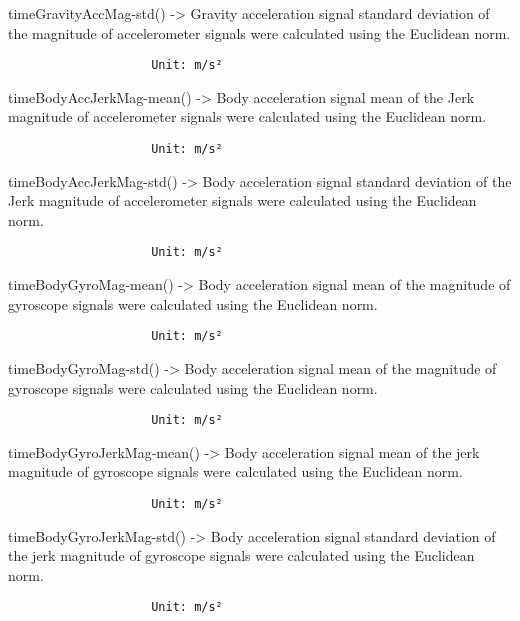 \documentclass[
]{article}
\begin{document}
timeGravityAccMag-std() -\textgreater{} Gravity acceleration signal
standard deviation of the magnitude of accelerometer signals were
calculated using the Euclidean norm.

\begin{verbatim}
                    Unit: m/s²
\end{verbatim}

timeBodyAccJerkMag-mean() -\textgreater{} Body acceleration signal mean
of the Jerk magnitude of accelerometer signals were calculated using the
Euclidean norm.

\begin{verbatim}
                    Unit: m/s²
\end{verbatim}

timeBodyAccJerkMag-std() -\textgreater{} Body acceleration signal
standard deviation of the Jerk magnitude of accelerometer signals were
calculated using the Euclidean norm.

\begin{verbatim}
                    Unit: m/s²
\end{verbatim}

timeBodyGyroMag-mean() -\textgreater{} Body acceleration signal mean of
the magnitude of gyroscope signals were calculated using the Euclidean
norm.

\begin{verbatim}
                    Unit: m/s²
\end{verbatim}

timeBodyGyroMag-std() -\textgreater{} Body acceleration signal mean of
the magnitude of gyroscope signals were calculated using the Euclidean
norm.

\begin{verbatim}
                    Unit: m/s²
\end{verbatim}

timeBodyGyroJerkMag-mean() -\textgreater{} Body acceleration signal mean
of the jerk magnitude of gyroscope signals were calculated using the
Euclidean norm.

\begin{verbatim}
                    Unit: m/s²
\end{verbatim}

timeBodyGyroJerkMag-std() -\textgreater{} Body acceleration signal
standard deviation of the jerk magnitude of gyroscope signals were
calculated using the Euclidean norm.

\begin{verbatim}
                    Unit: m/s²
\end{verbatim}
\end{document}
